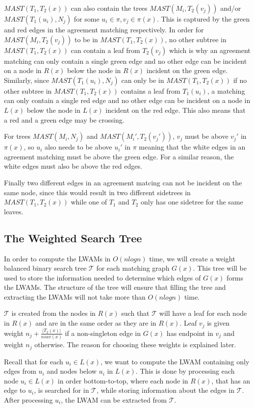 $MAST(T_1, T_2(x))$ can also contain the trees $MAST(M_i, T_2(v_j))$ and/or $MAST(T_1(u_i), N_j)$ for some $u_i \in \pi, v_j \in \pi(x)$. This is captured by the green and red edges in the agreement matching respectively. In order for $MAST(M_i, T_2(v_j))$ to be in $MAST(T_1, T_2(x))$, no other subtree in $MAST(T_1, T_2(x))$ can contain a leaf from $T_2(v_j)$ which is why an agreement matching can only contain a single green edge and no other edge can be incident on a node in $R(x)$ below the node in $R(x)$ incident on the green edge. Similarly, since $MAST(T_1(u_i), N_j)$ can only be in $MAST(T_1, T_2(x))$ if no other subtree in $MAST(T_1, T_2(x))$ contains a leaf from $T_1(u_i)$, a matching can only contain a single red edge and no other edge can be incident on a node in $L(x)$ below the node in $L(x)$ incident on the red edge. This also means that a red and a green edge may be crossing.

For trees $MAST(M_i, N_j)$ and $MAST(M_i', T_2(v_j'))$, $v_j$ must be above $v_j'$ in $\pi(x)$, so $u_i$ also needs to be above $u_i'$ in $\pi$ meaning that the white edges in an agreement matching must be above the green edge. For a similar reason, the white edges must also be above the red edges.

Finally two different edges in an agreement matcing can not be incident on the same node, since this would result in two different sidetrees in $MAST(T_1, T_2(x))$ while one of $T_1$ and $T_2$ only has one sidetree for the same leaves.

\subsection{The Weighted Search Tree}
In order to compute the LWAMs in $O(nlogn)$ time, we will create a weight balanced binary search tree $\mathcal{T}$ for each matching graph $G(x)$. This tree will be used to store the information needed to determine which edges of $G(x)$ forms the LWAMs. The structure of the tree will ensure that filling the tree and extracting the LWAMs will not take more than $O(nlogn)$ time.

$\mathcal{T}$ is created from the nodes in $R(x)$ such that $\mathcal{T}$ will have a leaf for each node in $R(x)$ and are in the same order as they are in $R(x)$. Leaf $v_j$ is given weight $n_j + \frac{|T_2(x)|}{nsav(x)}$ if a non-singleton edge in $G(x)$ has endpoint in $v_j$ and weight $n_j$ otherwise. The reason for choosing these weights is explained later.

Recall that for each $u_i \in L(x)$, we want to compute the LWAM containing only edges from $u_i$ and nodes below $u_i$ in $L(x)$. This is done by processing each node $u_i \in L(x)$ in order bottom-to-top, where each node in $R(x)$, that has an edge to $u_i$, is searched for in $\mathcal{T}$, while storing information about the edges in $\mathcal{T}$.  After processing $u_i$, the LWAM can be extracted from $\mathcal{T}$. 

